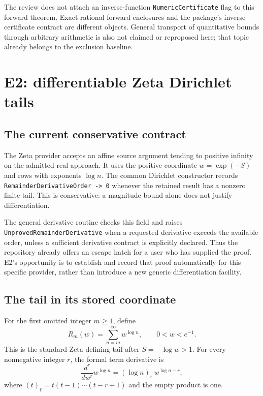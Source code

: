 \documentclass[11pt,a4paper]{article}
\newcommand{\code}[1]{\nolinkurl{#1}}
\begin{document}
The review does not attach an inverse-function \code{NumericCertificate} flag to this forward theorem. Exact rational forward enclosures and the package's inverse certificate contract are different objects. General transport of quantitative bounds through arbitrary arithmetic is also not claimed or reproposed here; that topic already belongs to the exclusion baseline.

\section{E2: differentiable Zeta Dirichlet tails}\label{sec:zeta}

\subsection{The current conservative contract}
The Zeta provider accepts an affine source argument tending to positive infinity on the admitted real approach. It uses the positive coordinate $w=\exp(-S)$ and rows with exponents $\log n$. The common Dirichlet constructor records \code{RemainderDerivativeOrder -> 0} whenever the retained result has a nonzero finite tail. This is conservative: a magnitude bound alone does not justify differentiation.\cite{dirichlet}

The general derivative routine checks this field and raises \code{UnprovedRemainderDerivative} when a requested derivative exceeds the available order, unless a sufficient derivative contract is explicitly declared. Thus the repository already offers an escape hatch for a user who has supplied the proof. E2's opportunity is to establish and record that proof automatically for this specific provider, rather than introduce a new generic differentiation facility.\cite{seriesoperations}

\subsection{The tail in its stored coordinate}
For the first omitted integer $m\geq1$, define
\begin{equation}\label{eq:zeta-tail}
 R_m(w)=\sum_{n=m}^{\infty}w^{\log n},
 \qquad 0<w<e^{-1}.
\end{equation}
This is the standard Zeta defining tail after $S=-\log w>1$.\cite{dlmfzeta}
For every nonnegative integer $r$, the formal term derivative is
\begin{equation}\label{eq:zeta-derivative}
 \frac{d^r}{dw^r}w^{\log n}
 = (\log n)_{\underline r}\,w^{\log n-r},
\end{equation}
where $(t)_{\underline r}=t(t-1)\cdots(t-r+1)$ and the empty product is one.
\end{document}
